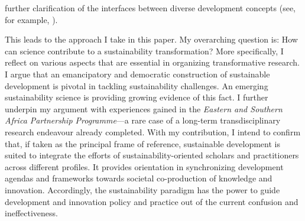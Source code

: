 \documentclass[10pt,a4paper]{article}
\begin{document}
\begin{multicols}{2}
further clarification of the interfaces between diverse development concepts (see, for example, \citep{r09, r10, r11, r19, r31, r32, r33, r34}). 

This leads to the approach I take in this paper. My overarching question is: How can science contribute to a sustainability transformation? More specifically, I reflect on various aspects that are essential in organizing transformative research. I argue that an emancipatory and democratic construction of sustainable development is pivotal in tackling sustainability challenges. An emerging sustainability science is providing growing evidence of this fact. I further underpin my argument with experiences gained in the \textit{Eastern and Southern Africa Partnership Programme}---a rare case of a long-term transdisciplinary research endeavour already completed. With my contribution, I intend to confirm that, if taken as the principal frame of reference, sustainable development is suited to integrate the efforts of sustainability-oriented scholars and practitioners across different profiles. It provides orientation in synchronizing development agendas and frameworks towards societal co-production of knowledge and innovation. Accordingly, the sustainability paradigm has the power to guide development and innovation policy and practice out of the current confusion and ineffectiveness. 


\end{multicols}
\end{document}
